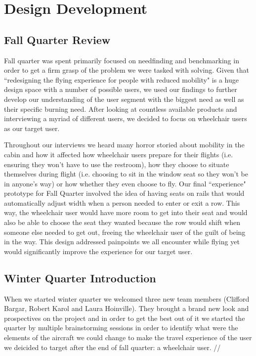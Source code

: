 \chapter{Design Development}

\section{Fall Quarter Review}
Fall quarter was spent primarily focused on needfinding and benchmarking in order to get a firm grasp of the problem we were tasked with solving. Given that ``redesigning the flying experience for people with reduced mobility" is a huge design space with a number of possible users, we used our findings to further develop our understanding of the user segment with the biggest need as well as their specific burning need. After looking at countless available products and interviewing a myriad of different users, we decided to focus on wheelchair users as our target user. 


Throughout our interviews we heard many horror storied about mobility in the cabin and how it affected how wheelchair users prepare for their flights (i.e. ensuring they won't have to use the restroom), how they choose to situate themselves during flight (i.e. choosing to sit in the window seat so they won't be in anyone's way) or how whether they even choose to fly. Our final ``experience" prototype for Fall Quarter involved the idea of having seats on rails that would automatically adjust width when a person needed to enter or exit a row. This way, the wheelchair user would have more room to get into their seat and would also be able to choose the seat they wanted because the row would shift when someone else needed to get out, freeing the wheelchair user of the guilt of being in the way. This design addressed painpoints we all encounter while flying yet would significantly improve the experience for our target user. 

\section{Winter Quarter Introduction}
When we started winter quarter we welcomed three new team members (Clifford Bargar, Robert Karol and Laura Hoinville). They brought a brand new look and prospectives on the project and in order to get the best out of it we started the quarter by multiple brainstorming sessions in order to identify what were the elements of the aircraft we could change to make the travel experience of the user we deicided to target after the end of fall quarter: a wheelchair user. //

